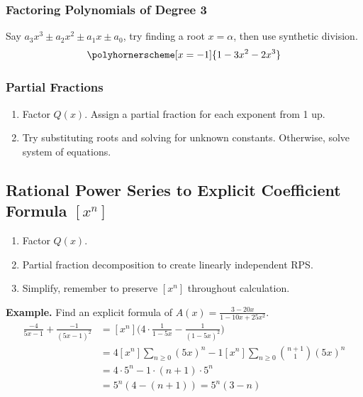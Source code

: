 \documentclass[11pt]{article}
\newenvironment{eg}[1]{
\begin{tcolorbox}[colback = white!15, arc=0pt,outer arc=0pt, colframe = black]
{\color{black} \textbf{Example.} #1} \\[5pt]
}
{
\end{tcolorbox}
}
\newcommand{\lstspacing}{\setlength\itemsep{1pt}}
\begin{document}
\subsubsection{Factoring Polynomials of Degree 3}
Say $a_3x^3 \pm a_2x^2 \pm a_1x \pm a_0$, try finding a root $x = \alpha$, then use synthetic division. 
$$\polyhornerscheme[x=-1]{1-3x^2-2x^3}$$
\subsubsection{Partial Fractions}
\begin{enumerate}[(1)]
    \item Factor $Q(x)$. Assign a partial fraction for each exponent from 1 up. 
    \item Try substituting roots and solving for unknown constants. Otherwise, solve system of equations.
\end{enumerate}

\subsection{Rational Power Series to Explicit Coefficient Formula $[x^n]$}
\begin{enumerate}[(1)]
    \lstspacing
    \item Factor $Q(x)$. 
    \item Partial fraction decomposition to create linearly independent RPS.
    \item Simplify, remember to preserve $[x^n]$ throughout calculation.   
\end{enumerate}
\begin{eg}{Find an explicit formula of $A(x) = \frac{3-20x}{1-10x+25x^2}$.}
\vspace{-15pt}
\begin{align*}
    [x^n] \frac{-4}{5x-1} + \frac{-1}{(5x-1)^2} &=  [x^n] \bigg(4 \cdot \frac{1}{1-5x} - \frac{1}{(1-5x)^2} \bigg)\\
    &= 4[x^n] \sum_{n \geq 0} (5x)^n -1 [x^n] \sum_{n \geq 0} \binom{n+1}{1}(5x)^n\\
    &= 4 \cdot 5^n - 1\cdot (n+1) \cdot 5^n\\
    &= 5^n (4 - (n + 1)) = 5^n(3 - n)
\end{align*}
\end{eg}
\end{document}
